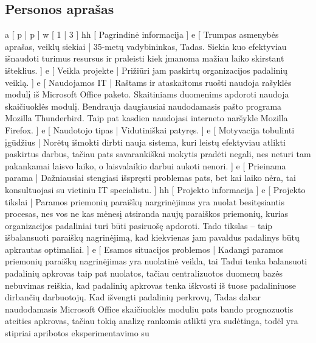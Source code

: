 \subsection{Personos aprašas}
\xtableu
{
  a [ p | p ]
  w [ 1 | 3 ]
  hh [ Pagrindinė informacija ]
  e [ Trumpas asmenybės aprašas, veiklų siekiai 
  | 
    35-metų vadybininkas, Tadas. Siekia kuo efektyviau išnaudoti turimus resursus ir praleisti
    kiek įmanoma mažiau laiko skirstant išteklius.
  ]
  e [ Veikla projekte 
  | 
    Prižiūri jam paskirtų organizacijos padalinių veiklą.
  ]
  e [ Naudojamos IT 
  | 
    Raštams ir ataskaitoms ruošti naudoja rašyklės modulį iš Microsoft Office paketo. Skaitiniams
    duomenims apdoroti naudoja skaičiuoklės modulį. Bendrauja daugiausiai naudodamasis pašto
    programa Mozilla Thunderbird. Taip pat kasdien naudojasi interneto naršykle Mozilla Firefox.
  ]
  e [ Naudotojo tipas 
  | 
    Vidutiniškai patyręs. 
  ]
  e [ Motyvacija tobulinti įgūdžius 
  |
    Norėtų išmokti dirbti nauja sistema, kuri leistų efektyviau atlikti paskirtus darbus, tačiau
    pats savarankiškai mokytis pradėti negali, nes neturi tam pakankamai laisvo laiko, o
    laisvalaikio darbui aukoti nenori.
  ]
  e [ Prieinama parama 
  | 
    Dažniausiai stengiasi išspręsti problemas pats, bet kai laiko nėra, tai konsultuojasi
    su vietiniu IT specialistu.
  ]
  hh [ Projekto informacija ]
  e [ Projekto tikslai 
  | 
    Paramos priemonių paraiškų nargrinėjimas yra nuolat besitęsiantis procesas, nes vos ne
    kas mėnesį atsiranda naujų paraiškos priemonių, kurias organizacijos padaliniai turi būti
    pasiruošę apdoroti. Tado tikslas – taip išbalansuoti paraiškų nagrinėjimą, kad kiekvienas
    jam pavaldus padalinys būtų apkrautas optimaliai.
  ]
  e [ Esamos situacijos problemos 
  | 
    Kadangi paramos priemonių paraiškų nagrinėjimas yra nuolatinė veikla, tai Tadui tenka 
    balansuoti padalinių apkrovas taip pat nuolatos, tačiau centralizuotos duomenų bazės
    nebuvimas reiškia, kad padalinių apkrovas tenka iškvosti iš tuose padaliniuose dirbančių
    darbuotojų. Kad išvengti padalinių perkrovų, Tadas dabar naudodamasis Microsoft Office
    skaičiuoklės moduliu pats bando prognozuotis ateities apkrovas, tačiau tokią analizę 
    rankomis atlikti yra sudėtinga, todėl yra stipriai apribotos eksperimentavimo su
}
